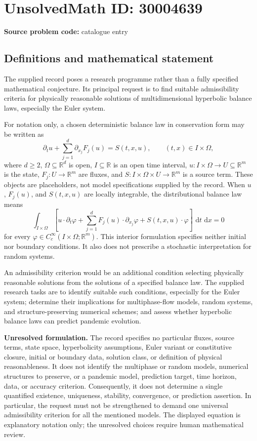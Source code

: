 \documentclass[11pt]{article}
\newcommand{\R}{\mathbb{R}}
\newcommand{\dd}{\,\mathrm{d}}
\begin{document}
\section*{UnsolvedMath ID: 30004639}
\textbf{Source problem code:} catalogue entry
\subsection{Definitions and mathematical statement}
The supplied record poses a research programme rather than a fully specified mathematical conjecture. Its principal request is to find suitable admissibility criteria for physically reasonable solutions of multidimensional hyperbolic balance laws, especially the Euler system.

For notation only, a chosen deterministic balance law in conservation form may be written as
\[
\partial_t u+\sum_{j=1}^{d}\partial_{x_j}F_j(u)=S(t,x,u),\qquad (t,x)\in I\times\Omega,
\]
where \(d\geq2\), \(\Omega\subseteq\R^d\) is open, \(I\subseteq\R\) is an open time interval, \(u:I\times\Omega\to U\subseteq\R^m\) is the state, \(F_j:U\to\R^m\) are fluxes, and \(S:I\times\Omega\times U\to\R^m\) is a source term. These objects are placeholders, not model specifications supplied by the record. When \(u\), \(F_j(u)\), and \(S(t,x,u)\) are locally integrable, the distributional balance law means
\[
\int_{I\times\Omega}\left[u\cdot\partial_t\varphi+\sum_{j=1}^{d}F_j(u)\cdot\partial_{x_j}\varphi+S(t,x,u)\cdot\varphi\right]\,\dd t\,\dd x=0
\]
for every \(\varphi\in C_c^\infty(I\times\Omega;\R^m)\). This interior formulation specifies neither initial nor boundary conditions. It also does not prescribe a stochastic interpretation for random systems.

An admissibility criterion would be an additional condition selecting physically reasonable solutions from the solutions of a specified balance law. The supplied research tasks are to identify suitable such conditions, especially for the Euler system; determine their implications for multiphase-flow models, random systems, and structure-preserving numerical schemes; and assess whether hyperbolic balance laws can predict pandemic evolution.

\textbf{Unresolved formulation.} The record specifies no particular fluxes, source terms, state space, hyperbolicity assumptions, Euler variant or constitutive closure, initial or boundary data, solution class, or definition of physical reasonableness. It does not identify the multiphase or random models, numerical structures to preserve, or a pandemic model, prediction target, time horizon, data, or accuracy criterion. Consequently, it does not determine a single quantified existence, uniqueness, stability, convergence, or prediction assertion. In particular, the request must not be strengthened to demand one universal admissibility criterion for all the mentioned models. The displayed equation is explanatory notation only; the unresolved choices require human mathematical review.
\end{document}
